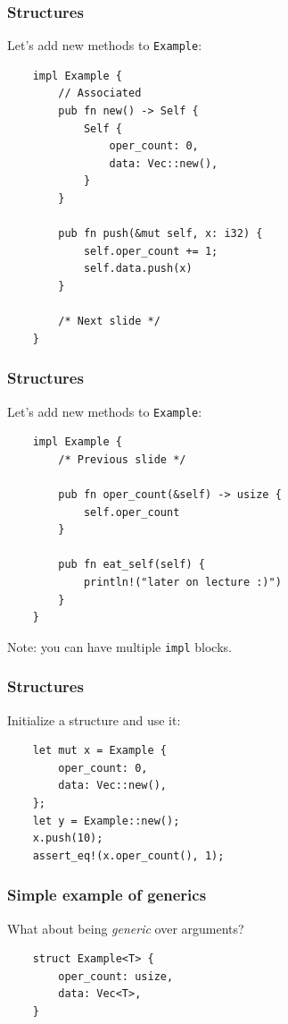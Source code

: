 \documentclass[aspectratio=1610,t]{beamer}
\begin{document}

\begin{frame}[fragile]
\frametitle{Structures}
Let's add new methods to \texttt{Example}:

\begin{verbatim}
    impl Example {
        // Associated
        pub fn new() -> Self {
            Self {
                oper_count: 0,
                data: Vec::new(),
            }
        }
    
        pub fn push(&mut self, x: i32) {
            self.oper_count += 1;
            self.data.push(x)
        }

        /* Next slide */
    }    
\end{verbatim}
\end{frame}


\begin{frame}[fragile]
\frametitle{Structures}
Let's add new methods to \texttt{Example}:

\begin{verbatim}
    impl Example {
        /* Previous slide */

        pub fn oper_count(&self) -> usize {
            self.oper_count
        }
    
        pub fn eat_self(self) {
            println!("later on lecture :)")
        }
    }
\end{verbatim}

Note: you can have multiple \texttt{impl} blocks.
\end{frame}


\begin{frame}[fragile]
\frametitle{Structures}
Initialize a structure and use it:

\begin{verbatim}
    let mut x = Example {
        oper_count: 0,
        data: Vec::new(),
    };
    let y = Example::new();
    x.push(10);
    assert_eq!(x.oper_count(), 1);
\end{verbatim}
\end{frame}


\begin{frame}[fragile]
\frametitle{Simple example of generics}
What about being \textit{generic} over arguments?

\begin{verbatim}
    struct Example<T> {
        oper_count: usize,
        data: Vec<T>,
    }
\end{verbatim}
\end{frame}
\end{document}
